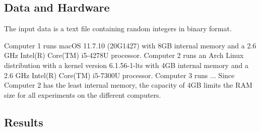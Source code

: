 \documentclass[twocolumn]{article}
\begin{document}
\subsection{Data and Hardware}
\label{sub:Data and Hardware}

The input data is a text file containing random integers in binary format.

Computer 1 runs macOS 11.7.10 (20G1427) with 8GB internal memory and a 2.6 GHz Intel(R) Core(TM) i5-4278U processor.
Computer 2 runs an Arch Linux distribution with a kernel version 6.1.56-1-lts with 4GB internal memory and a 2.6 GHz Intel(R) Core(TM) i5-7300U  processor.
Computer 3 runs ...  %
Since Computer 2 has the least internal memory, the capacity of 4GB limits the RAM size for all experiments on the different computers.

\subsection{Results}
\label{sub:Results}
\end{document}
